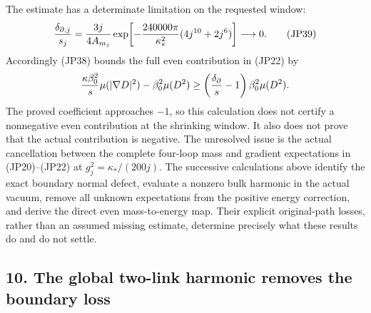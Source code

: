 \documentclass[11pt]{article}
\begin{document}
The estimate has a determinate limitation on the requested window:
\[
 {\delta_{\partial,j}\over s_j}
 ={3j\over4A_{m_j}}
       \exp\!\left[-{240000\pi\over\kappa_*^2}
                         (4j^{10}+2j^6)\right]\longrightarrow0 .
 \tag{JP39}
\]
Accordingly (JP38) bounds the full even contribution in (JP22) by
\[
 {\kappa\beta_0^2\over s}\mu(|\nabla D|^2)
                -\beta_0^2\mu(D^2)
 \ge \left({\delta_\partial\over s}-1\right)
                       \beta_0^2\mu(D^2).
\]
The proved coefficient approaches \(-1\), so this calculation does
not certify a nonnegative even contribution at the shrinking window.
It also does not prove that the actual contribution is negative.
The unresolved issue is the actual cancellation between the complete
four-loop mass and gradient expectations in (JP20)–(JP22) at
\(g_j^2=\kappa_*/(200j)\). The successive calculations above identify
the exact boundary normal defect, evaluate a nonzero bulk harmonic
in the actual vacuum, remove all unknown expectations from the positive
energy correction, and derive the direct even mass-to-energy map.
Their explicit original-path losses, rather than an assumed missing
estimate, determine precisely what these results do and do not settle.

\subsection*{10. The global two-link harmonic removes the boundary loss}
\end{document}
